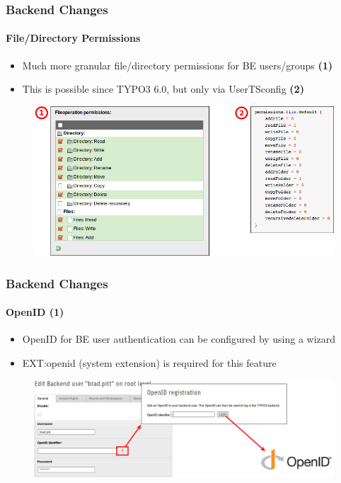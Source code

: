 
\begin{frame}[fragile]
	\frametitle{Backend Changes}
	\framesubtitle{File/Directory Permissions}

 	\begin{itemize}
		\item Much more granular file/directory permissions for BE users/groups
			\begingroup\color{typo3red}\textbf{(1)}\endgroup
		\item This is possible since TYPO3 6.0, but only via UserTSconfig
			\begingroup\color{typo3red}\textbf{(2)}\endgroup
	\end{itemize}

	\begin{figure}
		\includegraphics[width=0.75\linewidth]{Images/BackendChanges/FileAndDirectoryPermissions.png}
	\end{figure}

\end{frame}


\begin{frame}[fragile]
	\frametitle{Backend Changes}
	\framesubtitle{OpenID (1)}

 	\begin{itemize}
		\item OpenID for BE user authentication can be configured by using a wizard
		\item EXT:openid (system extension) is required for this feature
	\end{itemize}

	\begin{figure}
		\includegraphics[width=0.95\linewidth]{Images/BackendChanges/OpenIdWizard.png}
	\end{figure}

\end{frame}

